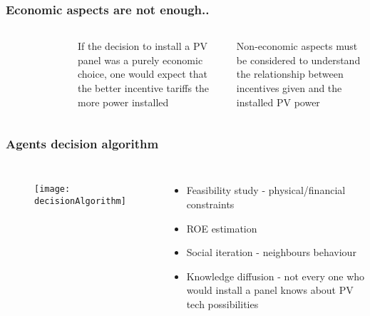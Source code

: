 \documentclass{beamer}
\begin{document}
  	\begin{frame}
	\frametitle{Economic aspects are not enough..}
	 \begin{columns}
		\begin{figure}[hbt]
			\\
	  	\end{figure}
	  		  	If the decision to install a PV panel was a purely economic choice, one would expect that the better incentive tariffs the more power installed
	  	\begin{block}{}
	  	Non-economic aspects must be considered to understand the relationship between incentives given and the installed PV power
	  	\end{block}
	  \end{columns}
  	\end{frame}
  	
  	\begin{frame}
  	\frametitle{Agents decision algorithm}
  		\begin{columns}
  			\column{.6\textwidth}
		  	\begin{figure}[hbt]
		  	\centering
					\texttt{[image: decisionAlgorithm]}
					\label{decisionAlgorithm}
		  	\end{figure}
		  	\column{.4\textwidth}
		  	\begin{itemize}
		  	\item Feasibility study - physical/financial constraints
		  	\item ROE estimation
		  	\item Social iteration - neighbours behaviour
		  	\item Knowledge diffusion - not every one who would install a panel knows about PV tech possibilities
		  	\end{itemize}
		\end{columns}
  	\end{frame}
  	
\end{document}

